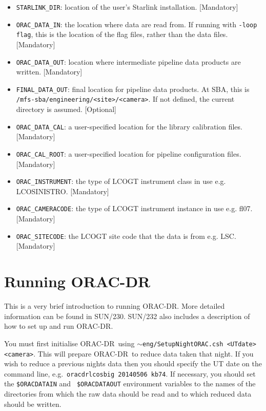 \documentclass[twoside,11pt]{article}
\newcommand{\xref}[3]{#1}
\renewcommand{\_}{\texttt{\symbol{95}}}
\newcommand{\ORACDR}{{\footnotesize ORAC-DR}}
\newcommand{\task}[1]{\textsf{#1}}
\begin{document}
\begin{itemize}

\item \verb+STARLINK_DIR+: location of the user's Starlink
  installation. [Mandatory]

\item \verb+ORAC_DATA_IN+: the location where data are read from. If
  running with \verb+-loop flag+, this is the location of the flag
  files, rather than the data files. [Mandatory]

\item \verb+ORAC_DATA_OUT+: location where intermediate pipeline data products are
  written. [Mandatory]

\item \verb+FINAL_DATA_OUT+: final location for pipeline data products. At SBA,
  this is \\ \verb+/mfs-sba/engineering/<site>/<camera>+. If not defined, the current
  directory is assumed. [Optional]

\item \verb+ORAC_DATA_CAL+: a user-specified location for
  the library calibration files. [Mandatory]

\item \verb+ORAC_CAL_ROOT+: a user-specified location for
  pipeline configuration files. [Mandatory]

\item \verb+ORAC_INSTRUMENT+: the type of LCOGT instrument class in use e.g.
\task{LCOSINISTRO}. [Mandatory]

\item \verb+ORAC_CAMERACODE+: the type of LCOGT instrument instance in use e.g.
\task{fl07}. [Mandatory]

\item \verb+ORAC_SITECODE+: the LCOGT site code that the data is from  e.g.
\task{LSC}. [Mandatory]

\end{itemize}

\section{Running ORAC-DR}

This is a very brief introduction to running \ORACDR. More detailed
information can be found in \xref{SUN/230}{sun230}{}.
\xref{SUN/232}{sun232}{} also includes a description of how to set up
and run \ORACDR.

You must first initialise \ORACDR\ using \texttt{$\sim$eng/Setup\_Night\_ORAC.csh
<UTdate> <camera>}. This will
prepare \ORACDR\ to reduce data taken that night. If
you wish to reduce a previous nights data then you should specify the
UT date on the command line, e.g.\ \texttt{oracdr\_lcosbig 20140506 kb74}. If
necessary, you should set the \texttt{\$ORAC\_DATA\_IN} and \texttt{
  \$ORAC\_DATA\_OUT} environment variables to the names of the
directories from which the raw data should be read and to which reduced
data should be written.
\end{document}
